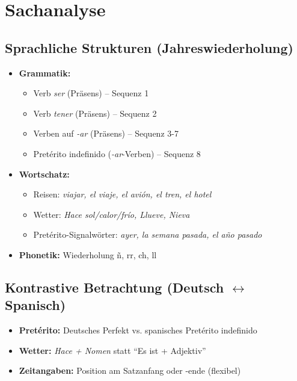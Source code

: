 \documentclass[11pt,a4paper]{article}
\begin{document}
\section{Sachanalyse}

\subsection{Sprachliche Strukturen (Jahreswiederholung)}
\begin{itemize}
    \item \textbf{Grammatik:}
    \begin{itemize}
        \item Verb \textit{ser} (Präsens) -- Sequenz 1
        \item Verb \textit{tener} (Präsens) -- Sequenz 2
        \item Verben auf \textit{-ar} (Präsens) -- Sequenz 3-7
        \item Pretérito indefinido (\textit{-ar}-Verben) -- Sequenz 8
    \end{itemize}
    \item \textbf{Wortschatz:}
    \begin{itemize}
        \item Reisen: \textit{viajar, el viaje, el avión, el tren, el hotel}
        \item Wetter: \textit{Hace sol/calor/frío, Llueve, Nieva}
        \item Pretérito-Signalwörter: \textit{ayer, la semana pasada, el año pasado}
    \end{itemize}
    \item \textbf{Phonetik:} Wiederholung ñ, rr, ch, ll
\end{itemize}

\subsection{Kontrastive Betrachtung (Deutsch $\leftrightarrow$ Spanisch)}
\begin{itemize}
    \item \textbf{Pretérito:} Deutsches Perfekt vs. spanisches Pretérito indefinido
    \item \textbf{Wetter:} \textit{Hace + Nomen} statt ``Es ist + Adjektiv''
    \item \textbf{Zeitangaben:} Position am Satzanfang oder -ende (flexibel)
\end{itemize}
\end{document}
